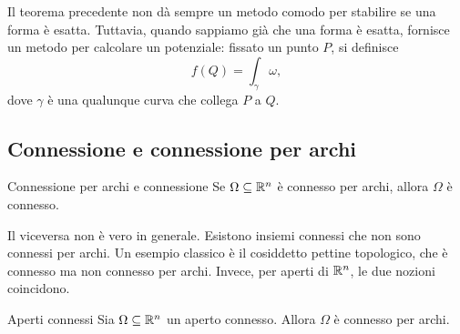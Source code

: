 \documentclass[a4paper]{article}
\begin{document}
Il teorema precedente non dà sempre un metodo comodo per stabilire se una forma è esatta. Tuttavia, quando sappiamo già che una forma è esatta, fornisce un metodo per calcolare un potenziale: fissato un punto \(P\), si definisce
\[
    f(Q)=\int_\gamma\omega,
\]
dove \(\gamma\) è una qualunque curva che collega \(P\) a \(Q\).

\subsection{Connessione e connessione per archi}

\begin{snippetproposition}{Connessione per archi e connessione}
    Se \(\Omega\subseteq\mathbb{R}^n\) è connesso per archi, allora \(\Omega\) è connesso.
\end{snippetproposition}

Il viceversa non è vero in generale. Esistono insiemi connessi che non sono connessi per archi. Un esempio classico è il cosiddetto pettine topologico, che è connesso ma non connesso per archi. Invece, per aperti di \(\mathbb{R}^n\), le due nozioni coincidono.

\begin{snippettheorem}{Aperti connessi}
    Sia \(\Omega\subseteq\mathbb{R}^n\) un aperto connesso. Allora \(\Omega\) è connesso per archi.
\end{snippettheorem}
\end{document}
